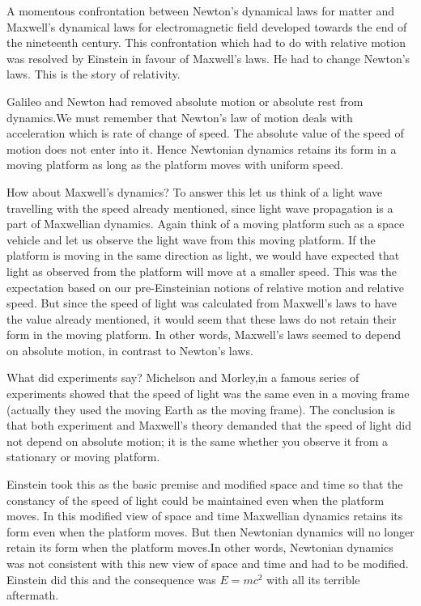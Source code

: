 A momentous confrontation between Newton's dynamical laws for
matter and Maxwell's dynamical laws for electromagnetic field
developed towards the end of the nineteenth century. This
confrontation which had to do with relative motion was
resolved by Einstein in favour of Maxwell's laws. He had to
change Newton's laws. This is the story of relativity.

Galileo and Newton had removed absolute motion or absolute
rest from dynamics.We must remember that Newton's law of
motion deals with acceleration which is rate of change of
speed. The absolute value of the speed of motion does not
enter into it. Hence Newtonian dynamics retains its form
in a moving platform as long as the platform moves with
uniform speed.

How about Maxwell's dynamics? To answer this let us think
of a light wave travelling with the speed already mentioned,
since light wave propagation is a part of Maxwellian dynamics.
Again think of a moving platform such as a space vehicle and
let us observe the light wave from this moving platform. If the
platform is moving in the same direction as light, we would
have expected that light as observed from the platform will
move at a smaller speed. This was the expectation
based on our pre-Einsteinian notions of relative motion
and relative speed. But since the speed of light was
calculated from Maxwell's laws to have the value already
mentioned, it would seem that these laws do not
retain their form in the moving platform. In other words,
Maxwell's laws seemed to depend on absolute
motion, in contrast to Newton's laws.

What did experiments say? Michelson and Morley,in a famous
series of experiments showed that the speed of light
was the same even in a moving frame (actually they
used the moving Earth as the moving frame). The
conclusion is that both experiment and Maxwell's
theory demanded that the speed of light did not
depend on absolute motion; it is the same whether
you observe it from a stationary or moving platform.

Einstein took this as the basic premise and modified
space and time so that the constancy of the speed of
light could be maintained even when the platform moves.
In this modified view of space and time Maxwellian
dynamics retains its form even when the platform moves.
But then Newtonian dynamics will no longer retain its
form when the platform moves.In other words, Newtonian
dynamics was not consistent with this new view of space
and time and had to be modified. Einstein did this and
the consequence was $E= mc^{2}$ with all its terrible
aftermath.

